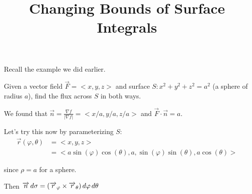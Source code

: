 \documentclass{ximera}
\title[Dig-In:]{Changing Bounds of Surface Integrals}
\begin{document}
\begin{abstract}
\end{abstract}
\maketitle


Recall the example we did earlier.

\begin{example}
Given a vector field $\overrightarrow{F} = <x,y,z>$ and surface $S: x^2 + y^2 + z^2 = a^2$ (a sphere of radius $a$), find the flux across $S$ in both ways.

We found that $\overrightarrow{n} = \frac{\nabla f}{|\nabla f|} = <x/a, y/a, z/a>$ and $\overrightarrow{F}\cdot \overrightarrow{n} = a$.
\end{example}


Let's try this now by parameterizing $S$:
    \begin{align*}
     \overrightarrow{r}(\varphi, \theta) &= <x,y,z> \\
     &= <a\sin(\varphi)\cos(\theta), a, \sin(\varphi)\sin(\theta), a\cos(\theta)>
    \end{align*}
    
since $\rho = a$ for a sphere.

Then $\overrightarrow{n} \mathop{}\!d \sigma = (\overrightarrow{r}_\varphi \times \overrightarrow{r}_\theta) \mathop{}\!d \varphi \mathop{}\!d \theta$
\end{document}
